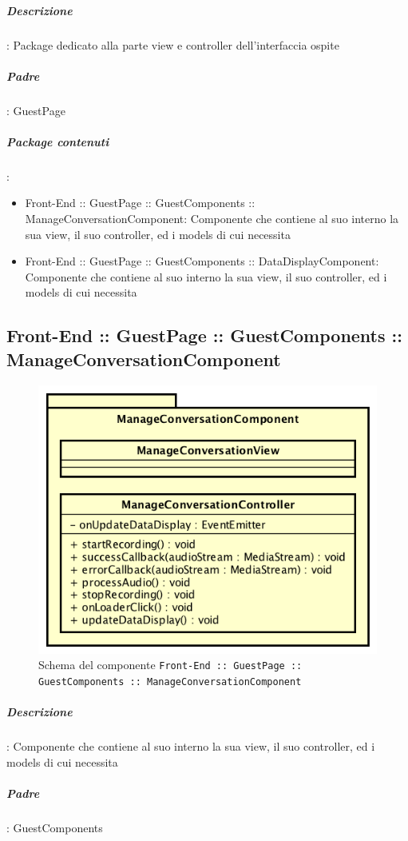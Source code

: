 \documentclass[../ManualeSviluppatore_v1.0.0.tex]{subfiles}
\begin{document}
			\subparagraph{Descrizione}: Package dedicato alla parte view e controller dell'interfaccia ospite
			\subparagraph{Padre}: GuestPage
			\subparagraph{Package contenuti}:
			\begin{itemize}
				\item Front-End :: GuestPage :: GuestComponents :: ManageConversationComponent: Componente che contiene al suo interno la sua view, il suo controller, ed i models di cui necessita
				\item Front-End :: GuestPage :: GuestComponents :: DataDisplayComponent: Componente che contiene al suo interno la sua view, il suo controller, ed i models di cui necessita
			\end{itemize}

	\newpage
	\subsection{Front-End :: GuestPage :: GuestComponents :: ManageConversationComponent}
	\begin{figure}[!h]
		\centering
		\includegraphics[scale=0.7]{Architettura/Front-End/GuestPage/GuestComponents/ManageConversationComponent.png}
		\caption{Schema del componente \texttt{Front-End :: GuestPage :: GuestComponents :: ManageConversationComponent}}
	\end{figure}

			\subparagraph{Descrizione}: Componente che contiene al suo interno la sua view, il suo controller, ed i models di cui necessita
			\subparagraph{Padre}: GuestComponents
			      
\end{document}
